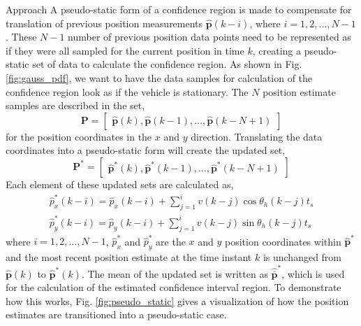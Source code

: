\begin{section}{Approach}
A pseudo-static form of a confidence region is made to compensate for translation of previous position measurements $\hat{\bm{p}}(k-i)$, where $i=1,2,\dots,N-1$. These $N-1$ number of previous position data points need to be represented as if they were all sampled for the current position in time $k$, creating a pseudo-static set of data to calculate the confidence region. As shown in Fig. \ref{fig:gauss_pdf}, we want to have the data samples for calculation of the confidence region look as if the vehicle is stationary. The $N$ position estimate samples are described in the set,
\begin{equation}
    \bm{P}=\begin{bmatrix} \hat{\bm{p}}(k) ,\hat{\bm{p}}(k-1),\dots,\hat{\bm{p}}(k-N+1) \end{bmatrix} 
\end{equation}
for the position coordinates in the $x$ and $y$ direction. Translating the data coordinates into a pseudo-static form will create the updated set,
\begin{equation}
    \bm{P}^*=\begin{bmatrix} \hat{\bm{p}}^*(k) ,\hat{\bm{p}}^*(k-1),\dots,\hat{\bm{p}}^*(k-N+1) \end{bmatrix} \nonumber
\end{equation}
Each element of these updated sets are calculated as,
    \begin{equation}
    \begin{split}
	\hat{p}_x^*(k-i) = \hat{p}_x(k-i)+\sum_{j=1}^i v(k-j)\cos{\theta_h(k-j)t_s} \\
	\hat{p}_y^*(k-i) = \hat{p}_y(k-i)+\sum_{j=1}^i v(k-j)\sin{\theta_h(k-j)t_s}
	\end{split}
	\end{equation}
where $i=1,2,\dots,N-1$, $\hat{p}_x^*$ and $\hat{p}_y^*$ are the $x$ and $y$ position coordinates within $\hat{\bm{p}}^*$ and the most recent position estimate at the time instant $k$ is unchanged from $\hat{\bm{p}}(k)$ to $\hat{\bm{p}}^*(k)$. The mean of the updated set is written as $\hat{\bar{\bm{p}}}^*$, which is used for the calculation of the estimated confidence interval region. To demonstrate how this works, Fig. \ref{fig:pseudo_static} gives a visualization of how the position estimates are transitioned into a pseudo-static case.


\end{section}
